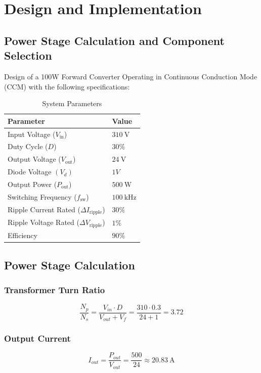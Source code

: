 \section{Design and Implementation}
\subsection{Power Stage Calculation and Component Selection}
Design of a 100W Forward Converter Operating in Continuous Conduction Mode (CCM) with
the following specifications:
\begin{table}[h!]
    \centering
    \begin{tabular}{ll}
        \toprule
        \textbf{Parameter} & \textbf{Value} \\
        \midrule
        Input Voltage ($V_{\text{in}}$) & $\SI{310}{\volt}$ \\
        Duty Cycle ($D$) & $30\% $ \\
        Output Voltage ($V_{\text{out}}$) & $\SI{24}{\volt}$ \\
        Diode Voltage $(V_d)$ & $1V$\\
        Output Power ($P_{\text{out}}$) & $\SI{500}{\watt}$ \\
        Switching Frequency ($f_{\text{sw}}$) & $\SI{100}{\kilo\hertz}$ \\
        Ripple Current Rated ($\Delta I_{\text{ripple}}$) & $30\%$ \\
        Ripple Voltage Rated ($\Delta V_{\text{ripple}}$) & $1\%$ \\
        Efficiency & $90\%$ \\
        \bottomrule
    \end{tabular}
    \caption{System Parameters}
    \label{tab:system_parameters}
\end{table}
\subsection{Power Stage Calculation}
\subsubsection*{Transformer Turn Ratio}
\[
\frac{N_p}{N_s} = \frac{V_{in} \cdot D}{V_{out} + V_f} = \frac{310 \cdot 0.3}{24 + 1} = 3.72
\]
\subsubsection*{Output Current}
\[
I_{out} = \frac{P_{out}}{V_{out}} = \frac{500}{24} \approx 20.83\ \text{A}
\]
